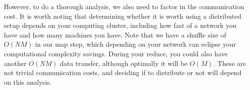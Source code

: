 \vspace{5 mm}
\noindent
However, to do a thorough analysis, we also need to factor in the communication 
cost. It is worth noting that determining whether it is worth using a 
distributed setup depends on your computing cluster, including how fast of a 
network you have and how many machines you have. Note that we have a shuffle 
size of $O(N M)$ in our map step, which depending on your network can 
eclipse your computational complexity savings. During your 
reduce, you could also have another $O(N M)$ data transfer, although optimally 
it will be $O(M)$. These are not trivial communication costs, and deciding if 
to distribute or not will depend on this analysis.

\newpage
